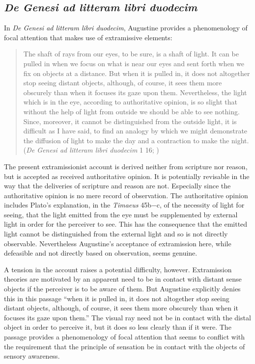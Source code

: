 \documentclass[12pt]{article}
\begin{document}

\subsection{\emph{De Genesi ad litteram libri duodecim}} %
\label{sub:de_genesi_ad_litteram_libri_duodecim}

In \emph{De Genesi ad litteram libri duodecim}, Augustine provides a phenomenology of focal attention that makes use of extramissive elements:
\begin{quote}
	The shaft of rays from our eyes, to be sure, is a shaft of light. It can be pulled in when we focus on what is near our eyes and sent forth when we fix on objects at a distance. But when it is pulled in, it does not altogether stop seeing distant objects, although, of course, it sees them more obscurely than when it focuses its gaze upon them. Nevertheless, the light which is in the eye, according to authoritative opinion, is so slight that without the help of light from outside we should be able to see nothing. Since, moreover, it cannot be distinguished from the outside light, it is difficult as I have said, to find an analogy by which we might demonstrate the diffusion of light to make the day and a contraction to make the night. (\emph{De Genesi ad litteram libri duodecim} 1 16; \citealt[37--38]{Taylor:1982aa})
\end{quote}
The present extramissionist account is derived neither from scripture nor reason, but is accepted as received authoritative opinion. It is potentially revisable in the way that the deliveries of scripture and reason are not. Especially since the authoritative opinion is no mere record of observation. The authoritative opinion includes Plato's explanation, in the \emph{Timaeus} 45b−c, of the necessity of light for seeing, that the light emitted from the eye must be supplemented by external light in order for the perceiver to see. This has the consequence that the emitted light cannot be distinguished from the external light and so is not directly observable. Nevertheless Augustine's acceptance of extramission here, while defeasible and not directly based on observation, seems genuine. 

A tension in the account raises a potential difficulty, however. Extramission theories are motivated by an apparent need to be in contact with distant sense objects if the perceiver is to be aware of them. But Augustine explicitly denies this in this passage ``when it is pulled in, it does not altogether stop seeing distant objects, although, of course, it sees them more obscurely than when it focuses its gaze upon them.'' The visual ray need not be in contact with the distal object in order to perceive it, but it does so less clearly than if it were. The passage provides a phenomenology of focal attention that seems to conflict with the requirement that the principle of sensation be in contact with the objects of sensory awareness.
\end{document}
